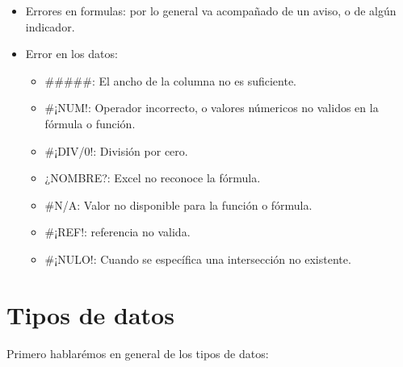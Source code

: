 \documentclass[12 pt,letterpaper]{article}
\begin{document}
\begin{itemize}
	\item Errores en formulas: por lo general va acompañado de un aviso, o de algún indicador. 

	\item Error en los datos: 
	
	\begin{itemize}
		
		\item \#\#\#\#\#: El ancho de la columna no es suficiente.
		
		\item \#¡NUM!: Operador incorrecto, o valores númericos no validos en la fórmula o función. 
		
		\item \#¡DIV/0!: División por cero.
		
		\item ¿NOMBRE?: Excel no reconoce la fórmula.
		
		\item \#N/A: Valor no disponible para la función o fórmula.
		
		\item \#¡REF!: referencia no valida. 
		
		\item \#¡NULO!: Cuando se específica una intersección no existente. 
		
	\end{itemize}
		

\end{itemize}

\section{Tipos de datos}

Primero hablarémos en general de los tipos de datos:
\end{document}
